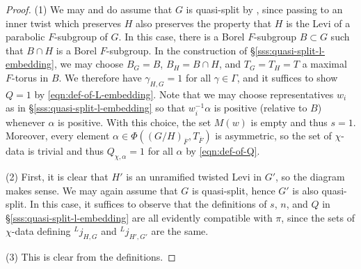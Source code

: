 \documentclass[reqno]{amsart}
\numberwithin{equation}{subsection}
\newcommand{\F}{\mathbf{F}}
\newcommand{\ol}[1]{\overline{#1}}
\newcommand{\wh}[1]{\widehat{#1}}
\newcommand{\co}{\colon}
\newcommand{\ld}{{}^L}
\DeclareMathOperator{\red}{red}
\DeclareMathOperator{\der}{der}
\DeclareMathOperator{\Fr}{Fr}
\newtheorem{lemma}[thm]{Lemma}
\theoremstyle{remark}
\numberwithin{equation}{subsection}
\numberwithin{figure}{subsection}
\begin{document}
\begin{proof}
(1) We may and do assume that $G$ is quasi-split by \cite[Lemma 6.4]{Kal21a}, since passing to an inner twist which preserves $H$ also preserves the property that $H$ is the Levi of a parabolic $F$-subgroup of $G$. In this case, there is a Borel $F$-subgroup $B \subset G$ such that $B \cap H$ is a Borel $F$-subgroup. In the construction of \S\ref{sss:quasi-split-l-embedding}, we may choose $B_G = B$, $B_H = B \cap H$, and $T_G = T_H = T$ a maximal $F$-torus in $B$. We therefore have $\gamma_{H,G} = 1$ for all $\gamma \in \Gamma$, and it suffices to show $Q = 1$ by \eqref{eqn:def-of-L-embedding}. Note that we may choose representatives $w_i$ as in \S\ref{sss:quasi-split-l-embedding} so that $w_i^{-1}\alpha$ is positive (relative to $B$) whenever $\alpha$ is positive. With this choice, the set $M(w)$ is empty and thus $s = 1$. Moreover, every element $\alpha \in \Phi((G/H)_{\ol F}, T_{\ol F})$ is asymmetric, so the set of $\chi$-data is trivial and thus $Q_{\chi,\alpha} = 1$ for all $\alpha$ by \eqref{eqn:def-of-Q}.

(2) First, it is clear that $H'$ is an unramified twisted Levi in $G'$, so the diagram makes sense. We may again assume that $G$ is quasi-split, hence $G'$ is also quasi-split. In this case, it suffices to observe that the definitions of $s$, $n$, and $Q$ in \S\ref{sss:quasi-split-l-embedding} are all evidently compatible with $\pi$, since the sets of $\chi$-data defining $\ld j_{H,G}$ and $\ld j_{H',G'}$ are the same.

(3) This is clear from the definitions.
\end{proof}


\end{document}
